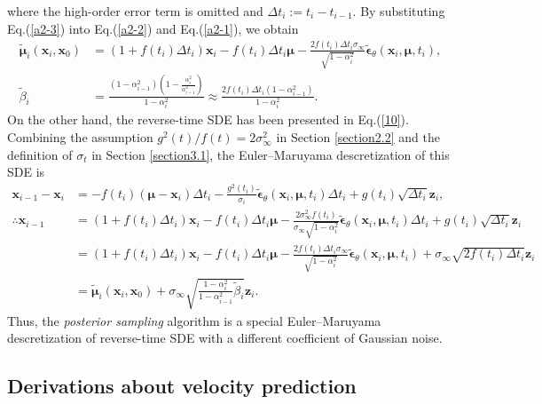 where the high-order error term is omitted and $\Delta t_i:=t_i-t_{i-1}$. By substituting Eq.(\ref{a2-3}) into Eq.(\ref{a2-2}) and Eq.(\ref{a2-1}), we obtain
\begin{align}
\tilde{\boldsymbol\mu}_{i}(\boldsymbol{x}_{i},\boldsymbol{x}_0)&=(1+f(t_i)\Delta t_i)\boldsymbol{x}_i-f(t_i)\Delta t_i\boldsymbol\mu-\frac{2f(t_i)\Delta t_i\sigma_\infty}{\sqrt{1-\alpha^2_i}}\tilde{\boldsymbol\epsilon}_\theta(\boldsymbol{x}_i,\boldsymbol\mu,t_i),\label{a2-4}\\
\tilde{\beta}_i&=\frac{(1-\alpha^2_{i-1})(1-\frac{\alpha^2_i}{\alpha^2_{i-1}})}{1-\alpha^2_i}
\approx\frac{2f(t_i)\Delta t_i(1-\alpha^2_{i-1})}{1-\alpha^2_i}.
\label{a2-5}
\end{align}
On the other hand, the reverse-time SDE has been presented in Eq.(\ref{10}). Combining the assumption $g^2(t)/f(t)=2\sigma_\infty^2$ in Section \ref{section2.2} and the definition of $\sigma_t$ in Section \ref{section3.1}, the Euler–Maruyama descretization of this SDE is
\begin{align}
\boldsymbol{x}_{i-1}-\boldsymbol{x}_i&=-f(t_i)(\boldsymbol\mu-\boldsymbol{x}_i)\Delta t_i-\frac{g^2(t_i)}{\sigma_i}\tilde{\boldsymbol\epsilon}_\theta(\boldsymbol{x}_i,\boldsymbol\mu,t_i)\Delta t_i+g(t_i)\sqrt{\Delta t_i}\boldsymbol{z}_i, \nonumber\\
\therefore \boldsymbol{x}_{i-1}&=(1+f(t_i)\Delta t_i)\boldsymbol{x}_i-f(t_i)\Delta t_i\boldsymbol\mu-\frac{2\sigma_\infty^2f(t_i)}{\sigma_\infty\sqrt{1-\alpha^2_i}}\tilde{\boldsymbol\epsilon}_\theta(\boldsymbol{x}_i,\boldsymbol\mu,t_i)\Delta t_i+g(t_i)\sqrt{\Delta t_i}\boldsymbol{z}_i \nonumber\\
&=(1+f(t_i)\Delta t_i)\boldsymbol{x}_i-f(t_i)\Delta t_i\boldsymbol\mu-\frac{2f(t_i)\Delta t_i\sigma_\infty}{\sqrt{1-\alpha^2_i}}\tilde{\boldsymbol\epsilon}_\theta(\boldsymbol{x}_i,\boldsymbol\mu,t_i)+\sigma_\infty\sqrt{2f(t_i)\Delta t_i}\boldsymbol{z}_i \nonumber\\
&=\tilde{\boldsymbol\mu}_i(\boldsymbol{x}_i,\boldsymbol{x}_0)+\sigma_\infty\sqrt{\frac{1-\alpha^2_i}{1-\alpha^2_{i-1}}\tilde{\beta}_i}\boldsymbol{z}_i.
\end{align}
Thus, the \textit{posterior sampling} algorithm is a special Euler–Maruyama descretization of reverse-time SDE with a different coefficient of Gaussian noise.

\subsection{Derivations about velocity prediction}
\label{appa3}

